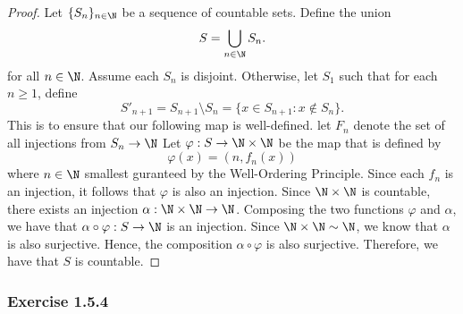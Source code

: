 \begin{proof}
    Let \( \{ S_n \}_{n \in \N} \) be a sequence of countable sets. Define the union 
    \[ S = \bigcup_{n \in \N } S_n. \]
    for all \( n \in \N \). Assume each \( S_n \) is disjoint. Otherwise, let \( S_1\) such that for each \( n \geq 1 \), define 
    \[ S'_{n+1} = S_{n+1} \setminus S_{n} = \{  x \in S_{n+1} : x \notin S_{n}   \}.\]
    This is to ensure that our following map is well-defined.
    let \( F_n \) denote the set of all injections from \( S_n \to \N \)
    Let \( \varphi: S \to \N \times \N \) be the map that is defined by 
    \[ \varphi(x) = (n, f_n(x))\] 
    where \( n \in \N \) smallest guranteed by the Well-Ordering Principle. Since each \(f_n \) is an injection, it follows that \( \varphi \) is also an injection.   
Since \( \N \times \N\) is countable, there exists an injection \( \alpha: \N \times \N \to \N \). Composing the two functions \( \varphi \) and \( \alpha \), we have that \( \alpha \circ \varphi: S \to \N \) is an injection. Since \( \N \times \N \sim \N \), we know that \( \alpha \) is also surjective. Hence, the composition \( \alpha \circ \varphi \) is also surjective. Therefore, we have that \( S \) is countable. 



\end{proof}



\subsubsection{Exercise 1.5.4}

